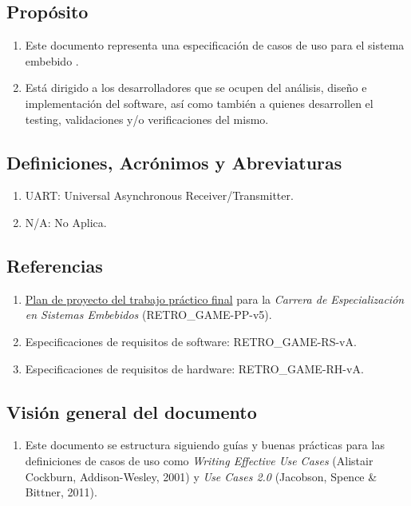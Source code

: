 \documentclass[11pt,a4paper]{article}
\begin{document}
\subsection{Propósito}

\begin{enumerate}
  \item Este documento representa una especificación de casos de uso para el sistema embebido \textit{\ttitle}. 
  \item Está dirigido a los desarrolladores que se ocupen del análisis, diseño e implementación del software, así como también a quienes desarrollen el testing, validaciones y/o verificaciones del mismo.
\end{enumerate}



\subsection{Definiciones, Acrónimos y Abreviaturas}

\begin{enumerate}
    \item UART: Universal Asynchronous Receiver/Transmitter. 
    \item N/A: No Aplica.
\end{enumerate}


\subsection{Referencias}

\begin{enumerate}
  \item \href{https://drive.google.com/file/d/1C3vEYR8wME6EzlZVVC-gT2u86dwnoZA-/view?usp=sharing}{Plan de proyecto del trabajo práctico final} para la \textit{Carrera de Especialización en Sistemas Embebidos} (RETRO\_GAME-PP-v5). 
  \item Especificaciones de requisitos de software: RETRO\_GAME-RS-vA.
  \item Especificaciones de requisitos de hardware: RETRO\_GAME-RH-vA.
\end{enumerate}


\subsection{Visión general del documento}


\begin{enumerate}
  \item Este documento se estructura siguiendo guías y buenas prácticas para las definiciones de casos de uso como \emph{Writing Effective Use Cases} (Alistair Cockburn, Addison-Wesley, 2001) y \emph{Use Cases 2.0} (Jacobson, Spence \& Bittner, 2011).
\end{enumerate}
\end{document}
